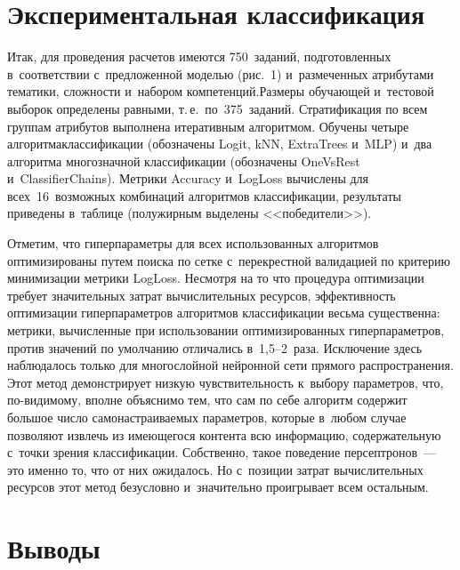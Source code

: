 \begin{multicols}{2}
\section{Экспериментальная классификация}

      Итак, для проведения расчетов имеются 750~заданий, подготовленных 
в~соответствии с~предложенной моделью (рис.~1) и~размеченных 
атрибутами тематики, сложности и~набором компетенций.\linebreak \mbox{Размеры} 
обучающей и~тестовой выборок определены равными, т.\,е.\ по~375~заданий. 
Стратификация по всем группам атрибутов выполнена итеративным 
алгоритмом. Обучены четыре алгоритма\linebreak классификации (обозначены Logit, 
kNN, \mbox{ExtraTrees} и~MLP) и~два алгоритма многозначной классификации 
(обозначены OneVsRest и~\mbox{ClassifierChains}). Метрики Accuracy и~LogLoss 
вычислены для всех~16~возможных комбинаций алгоритмов классификации, 
результаты приведены в~таб\-ли\-це (полужирным выделены 
<<победители>>).
      

     
     Отметим, что гиперпараметры для всех использованных алгоритмов 
оптимизированы путем поиска по сетке с~перекрестной валидацией по 
критерию минимизации метрики LogLoss. Несмотря на то что процедура 
оптимизации требует значительных затрат вычислительных ресурсов, 
эффективность оптимизации гиперпараметров алгоритмов классификации 
весьма существенна: метрики, вычисленные при использовании 
оптимизированных гиперпараметров, против значений по умолчанию 
отличались в~1,5--2~раза. Исключение здесь наблюдалось только для 
многослойной нейронной сети прямого распространения. Этот метод 
демонстрирует низкую чувствительность к~выбору па\-ра\-мет\-ров, что,  
по-ви\-ди\-мо\-му, вполне объяснимо тем, что сам по себе алгоритм содержит 
большое число самонастраиваемых параметров, которые в~любом случае 
позволяют извлечь из имеющегося контента всю информацию, 
содержательную с~точки зрения классификации. Собственно, такое 
поведение персептронов~--- это именно то, что от них ожидалось. Но 
с~позиции затрат вычислительных ресурсов этот метод безусловно 
и~значительно проигрывает всем остальным.

\section{Выводы}


\end{multicols}
